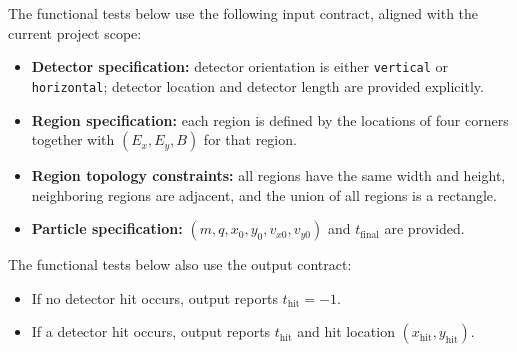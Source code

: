 \documentclass[12pt, titlepage]{article}
\begin{document}
The functional tests below use the following input contract, aligned with the
current project scope:
\begin{itemize}
  \item \textbf{Detector specification:} detector orientation is either
  \texttt{vertical} or \texttt{horizontal}; detector location and detector
  length are provided explicitly.
  \item \textbf{Region specification:} each region is defined by the locations
  of four corners together with $(E_x,E_y,B)$ for that region.
  \item \textbf{Region topology constraints:} all regions have the same width
  and height, neighboring regions are adjacent, and the union of all regions is
  a rectangle.
  \item \textbf{Particle specification:} $(m,q,x_0,y_0,v_{x0},v_{y0})$ and
  $t_{\text{final}}$ are provided.
\end{itemize}

The functional tests below also use the output contract:
\begin{itemize}
  \item If no detector hit occurs, output reports $t_{\mathrm{hit}}=-1$.
  \item If a detector hit occurs, output reports $t_{\mathrm{hit}}$ and hit
  location $(x_{\mathrm{hit}},y_{\mathrm{hit}})$.
\end{itemize}
\end{document}
